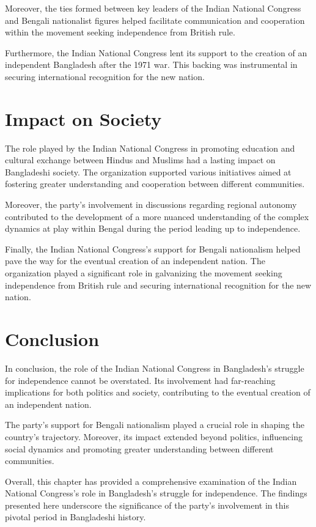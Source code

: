 Moreover, the ties formed between key leaders of the Indian National Congress and Bengali nationalist figures helped facilitate communication and cooperation within the movement seeking independence from British rule.

Furthermore, the Indian National Congress lent its support to the creation of an independent Bangladesh after the 1971 war. This backing was instrumental in securing international recognition for the new nation.

\section{Impact on Society}

The role played by the Indian National Congress in promoting education and cultural exchange between Hindus and Muslims had a lasting impact on Bangladeshi society. The organization supported various initiatives aimed at fostering greater understanding and cooperation between different communities.

Moreover, the party's involvement in discussions regarding regional autonomy contributed to the development of a more nuanced understanding of the complex dynamics at play within Bengal during the period leading up to independence.

Finally, the Indian National Congress's support for Bengali nationalism helped pave the way for the eventual creation of an independent nation. The organization played a significant role in galvanizing the movement seeking independence from British rule and securing international recognition for the new nation.

\section{Conclusion}

In conclusion, the role of the Indian National Congress in Bangladesh's struggle for independence cannot be overstated. Its involvement had far-reaching implications for both politics and society, contributing to the eventual creation of an independent nation.

The party's support for Bengali nationalism played a crucial role in shaping the country's trajectory. Moreover, its impact extended beyond politics, influencing social dynamics and promoting greater understanding between different communities.

Overall, this chapter has provided a comprehensive examination of the Indian National Congress's role in Bangladesh's struggle for independence. The findings presented here underscore the significance of the party's involvement in this pivotal period in Bangladeshi history.